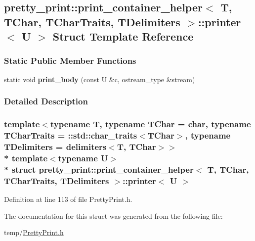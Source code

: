 \hypertarget{structpretty__print_1_1print__container__helper_1_1printer}{}\subsection{pretty\+\_\+print\+:\+:print\+\_\+container\+\_\+helper$<$ T, T\+Char, T\+Char\+Traits, T\+Delimiters $>$\+:\+:printer$<$ U $>$ Struct Template Reference}
\label{structpretty__print_1_1print__container__helper_1_1printer}
\subsubsection*{Static Public Member Functions}
\begin{DoxyCompactItemize}
\item 
static void {\bfseries print\+\_\+body} (const U \&c, ostream\+\_\+type \&stream)\hypertarget{structpretty__print_1_1print__container__helper_1_1printer_a136a8260b98e4c22a94dc1d86d9b2c11}{}\label{structpretty__print_1_1print__container__helper_1_1printer_a136a8260b98e4c22a94dc1d86d9b2c11}

\end{DoxyCompactItemize}


\subsubsection{Detailed Description}
\subsubsection*{template$<$typename T, typename T\+Char = char, typename T\+Char\+Traits = \+::std\+::char\+\_\+traits$<$\+T\+Char$>$, typename T\+Delimiters = delimiters$<$\+T, T\+Char$>$$>$\\*
template$<$typename U$>$\\*
struct pretty\+\_\+print\+::print\+\_\+container\+\_\+helper$<$ T, T\+Char, T\+Char\+Traits, T\+Delimiters $>$\+::printer$<$ U $>$}



Definition at line 113 of file Pretty\+Print.\+h.



The documentation for this struct was generated from the following file\+:\begin{DoxyCompactItemize}
\item 
temp/\hyperlink{PrettyPrint_8h}{Pretty\+Print.\+h}\end{DoxyCompactItemize}
